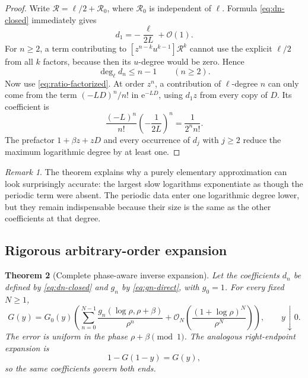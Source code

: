 \documentclass[11pt,oneside]{article}
\numberwithin{equation}{section}
\newtheorem{theorem}{Theorem}[section]
\theoremstyle{definition}
\theoremstyle{remark}
\newtheorem{remark}[theorem]{Remark}
\newcommand{\e}{\mathrm e}
\newcommand{\bigO}{\mathcal O}
\begin{document}
\begin{proof}
Write $\mathcal R=\ell/2+\mathcal R_0$, where $\mathcal R_0$ is independent of
$\ell$.  Formula \eqref{eq:dn-closed} immediately gives
\[
 d_1=-\frac{\ell}{2L}+\bigO(1).
\]
For $n\ge2$, a term contributing to
$[z^{n-k}u^{k-1}]\mathcal R^k$ cannot use the explicit $\ell/2$ from all $k$
factors, because then its $u$-degree would be zero.  Hence
\begin{equation}
 \deg_\ell d_n\le n-1\qquad(n\ge2).
 \label{eq:dn-degree}
\end{equation}
Now use \eqref{eq:ratio-factorized}.  At order $z^n$, a contribution of
$\ell$-degree $n$ can only come from the term $(-LD)^n/n!$ in
$\e^{-LD}$, using $d_1z$ from every copy of $D$.  Its coefficient is
\[
 \frac{(-L)^n}{n!}\left(-\frac1{2L}\right)^n=\frac1{2^nn!}.
\]
The prefactor $1+\beta z+zD$ and every occurrence of $d_j$ with $j\ge2$
reduce the maximum logarithmic degree by at least one.
\end{proof}

\begin{remark}
The theorem explains why a purely elementary approximation can look
surprisingly accurate: the largest slow logarithms exponentiate as though the
periodic term were absent.  The periodic data enter one logarithmic degree
lower, but they remain indispensable because their size is the same as the
other coefficients at that degree.
\end{remark}

\subsection{Rigorous arbitrary-order expansion}

\begin{theorem}[Complete phase-aware inverse expansion]
\label{thm:complete-inverse}
Let the coefficients $d_n$ be defined by \eqref{eq:dn-closed} and $g_n$ by
\eqref{eq:gn-direct}, with $g_0=1$.  For every fixed $N\ge1$,
\begin{equation}
\boxed{
 G(y)=G_0(y)\left(
 \sum_{n=0}^{N-1}\frac{g_n(\log\rho,\rho+\beta)}{\rho^n}
 +\bigO_N\!\left(\frac{(1+\log\rho)^N}{\rho^N}\right)
 \right),\qquad y\downarrow0.}
 \label{eq:complete-inverse}
\end{equation}
The error is uniform in the phase $\rho+\beta\pmod1$.  The analogous
right-endpoint expansion is
\begin{equation}
 1-G(1-y)=G(y),
 \label{eq:right-endpoint}
\end{equation}
so the same coefficients govern both ends.
\end{theorem}
\end{document}
